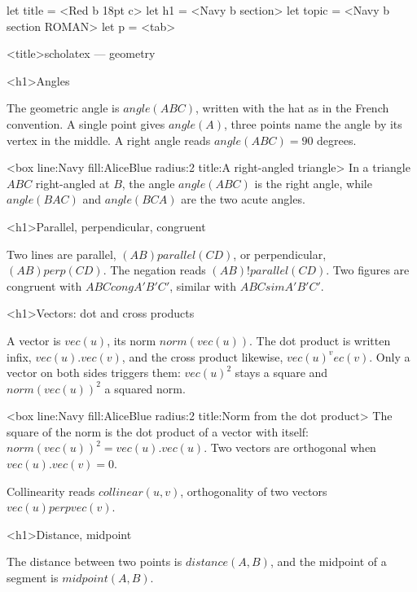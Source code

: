\documentclass[
  margins=8,
  font=Latin Modern Roman,
  size=12,
  linespread=1.4,
  lang=en
]{scholatex}
\begin{document}
let title = <Red b 18pt c>
let h1    = <Navy b section>
let topic = <Navy b section ROMAN>
let p     = <tab>

<title>scholatex — geometry

<h1>Angles

The geometric angle is $angle(ABC)$, written with the hat as in the
French convention. A single point gives $angle(A)$, three points name the
angle by its vertex in the middle. A right angle reads $angle(ABC) = 90$
degrees.

<box line:Navy fill:AliceBlue radius:2 title:{A right-angled triangle}>{
In a triangle $ABC$ right-angled at $B$, the angle $angle(ABC)$ is the
right angle, while $angle(BAC)$ and $angle(BCA)$ are the two acute angles.
}

<h1>Parallel, perpendicular, congruent

Two lines are parallel, $(AB) parallel (CD)$, or perpendicular,
$(AB) perp (CD)$. The negation reads $(AB) !parallel (CD)$. Two figures
are congruent with $ABC cong A'B'C'$, similar with $ABC sim A'B'C'$.

<h1>Vectors: dot and cross products

A vector is $vec(u)$, its norm $norm(vec(u))$. The dot product is written
infix, $vec(u) . vec(v)$, and the cross product likewise, $vec(u) ^ vec(v)$.
Only a vector on both sides triggers them: $vec(u)^2$ stays a square and
$norm(vec(u))^2$ a squared norm.

<box line:Navy fill:AliceBlue radius:2 title:{Norm from the dot product}>{
The square of the norm is the dot product of a vector with itself:
$norm(vec(u))^2 = vec(u) . vec(u)$. Two vectors are orthogonal when
$vec(u) . vec(v) = 0$.
}

Collinearity reads $collinear(u, v)$, orthogonality of two vectors
$vec(u) perp vec(v)$.

<h1>Distance, midpoint

The distance between two points is $distance(A, B)$, and the midpoint of
a segment is $midpoint(A, B)$.
\end{document}
